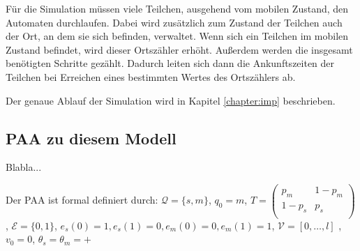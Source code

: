 Für die Simulation müssen viele Teilchen, ausgehend vom mobilen Zustand, den Automaten durchlaufen. Dabei wird zusätzlich zum Zustand der Teilchen auch der Ort, an dem sie sich befinden, verwaltet. Wenn sich ein Teilchen im mobilen Zustand befindet, wird dieser Ortszähler erhöht. Außerdem werden die insgesamt benötigten Schritte gezählt. Dadurch leiten sich dann die Ankunftszeiten der Teilchen bei Erreichen eines bestimmten Wertes des Ortszählers ab.

Der genaue Ablauf der Simulation wird in Kapitel \ref{chapter:imp} beschrieben.


\subsection{PAA zu diesem Modell}
Blabla...

Der PAA ist formal definiert durch: $\mathcal{Q} = \{s, m\}$, $q_0 = m$, $T =
 \begin{pmatrix}
  p_{m} & 1-p_{m}  \\
  1-p_{s} & p_{s} \\
 \end{pmatrix}$, $\mathcal{E} = \{0, 1\}$, $e_s(0) = 1, e_s(1)=0, e_m(0) = 0, e_m(1)=1$,
 $\mathcal{V} = [0, \ldots, l]$ , $v_0 = 0$, $\theta_s = \theta_m = + $

